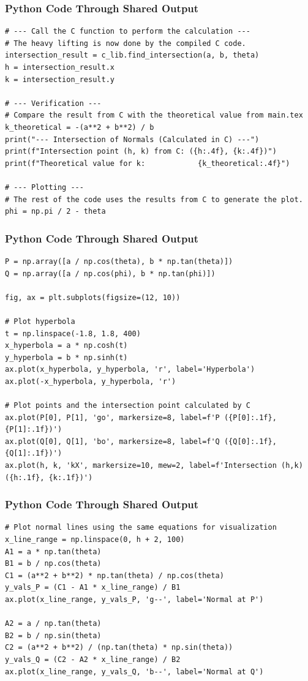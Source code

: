 \documentclass{beamer}
\begin{document}
\begin{frame}[fragile]
\frametitle{Python Code Through Shared Output}
\begin{lstlisting}
# --- Call the C function to perform the calculation ---
# The heavy lifting is now done by the compiled C code.
intersection_result = c_lib.find_intersection(a, b, theta)
h = intersection_result.x
k = intersection_result.y

# --- Verification ---
# Compare the result from C with the theoretical value from main.tex
k_theoretical = -(a**2 + b**2) / b
print("--- Intersection of Normals (Calculated in C) ---")
print(f"Intersection point (h, k) from C: ({h:.4f}, {k:.4f})")
print(f"Theoretical value for k:            {k_theoretical:.4f}")

# --- Plotting ---
# The rest of the code uses the results from C to generate the plot.
phi = np.pi / 2 - theta
\end{lstlisting}
\end{frame}
\begin{frame}[fragile]
\frametitle{Python Code Through Shared Output}
\begin{lstlisting}
P = np.array([a / np.cos(theta), b * np.tan(theta)])
Q = np.array([a / np.cos(phi), b * np.tan(phi)])

fig, ax = plt.subplots(figsize=(12, 10))

# Plot hyperbola
t = np.linspace(-1.8, 1.8, 400)
x_hyperbola = a * np.cosh(t)
y_hyperbola = b * np.sinh(t)
ax.plot(x_hyperbola, y_hyperbola, 'r', label='Hyperbola')
ax.plot(-x_hyperbola, y_hyperbola, 'r')

# Plot points and the intersection point calculated by C
ax.plot(P[0], P[1], 'go', markersize=8, label=f'P ({P[0]:.1f}, {P[1]:.1f})')
ax.plot(Q[0], Q[1], 'bo', markersize=8, label=f'Q ({Q[0]:.1f}, {Q[1]:.1f})')
ax.plot(h, k, 'kX', markersize=10, mew=2, label=f'Intersection (h,k) ({h:.1f}, {k:.1f})')
\end{lstlisting}
\end{frame}
\begin{frame}[fragile]
\frametitle{Python Code Through Shared Output}
\begin{lstlisting}
# Plot normal lines using the same equations for visualization
x_line_range = np.linspace(0, h + 2, 100)
A1 = a * np.tan(theta)
B1 = b / np.cos(theta)
C1 = (a**2 + b**2) * np.tan(theta) / np.cos(theta)
y_vals_P = (C1 - A1 * x_line_range) / B1
ax.plot(x_line_range, y_vals_P, 'g--', label='Normal at P')

A2 = a / np.tan(theta)
B2 = b / np.sin(theta)
C2 = (a**2 + b**2) / (np.tan(theta) * np.sin(theta))
y_vals_Q = (C2 - A2 * x_line_range) / B2
ax.plot(x_line_range, y_vals_Q, 'b--', label='Normal at Q')
\end{lstlisting}
\end{frame}
\end{document}
